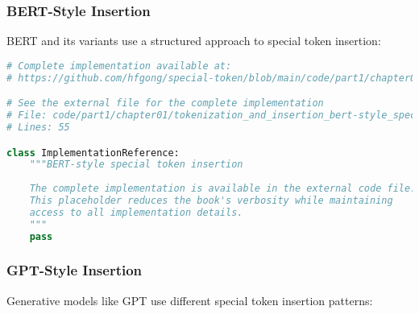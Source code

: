 \subsubsection{BERT-Style Insertion}

BERT and its variants use a structured approach to special token insertion:

\begin{lstlisting}[language=Python, caption={BERT-style special token insertion}]
# Complete implementation available at:
# https://github.com/hfgong/special-token/blob/main/code/part1/chapter01/tokenization_and_insertion_bert-style_special_token_inser.py

# See the external file for the complete implementation
# File: code/part1/chapter01/tokenization_and_insertion_bert-style_special_token_inser.py
# Lines: 55

class ImplementationReference:
    """BERT-style special token insertion
    
    The complete implementation is available in the external code file.
    This placeholder reduces the book's verbosity while maintaining
    access to all implementation details.
    """
    pass
\end{lstlisting}

\subsubsection{GPT-Style Insertion}

Generative models like GPT use different special token insertion patterns:

